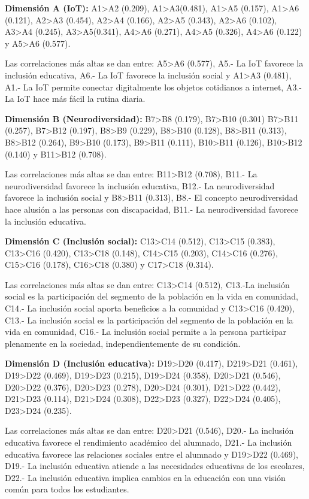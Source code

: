\documentclass[spanish]{textolivre}
\begin{document}
\textbf{Dimensión A (IoT):} A1>A2 (0.209), A1>A3(0.481), A1>A5 (0.157), A1>A6 (0.121), A2>A3 (0.454), A2>A4 (0.166), A2>A5 (0.343), A2>A6 (0.102), A3>A4 (0.245), A3>A5(0.341), A4>A6 (0.271), A4>A5 (0.326), A4>A6 (0.122) y A5>A6 (0.577).

Las correlaciones más altas se dan entre: A5>A6 (0.577), A5.- La IoT favorece la inclusión educativa, A6.- La IoT favorece la inclusión social y A1>A3 (0.481), A1.- La IoT permite conectar digitalmente los objetos cotidianos a internet, A3.- La IoT hace más fácil la rutina diaria.

\textbf{Dimensión B (Neurodiversidad):} B7>B8 (0.179), B7>B10 (0.301) B7>B11 (0.257), B7>B12 (0.197), B8>B9 (0.229), B8>B10 (0.128), B8>B11 (0.313), B8>B12 (0.264), B9>B10 (0.173), B9>B11 (0.111), B10>B11 (0.126), B10>B12 (0.140) y B11>B12 (0.708).

Las correlaciones más altas se dan entre: B11>B12 (0.708), B11.- La neurodiversidad favorece la inclusión educativa, B12.- La neurodiversidad favorece la inclusión social y B8>B11 (0.313), B8.- El concepto neurodiversidad hace alusión a las personas con discapacidad, B11.- La neurodiversidad favorece la inclusión educativa.

\textbf{Dimensión C (Inclusión social):} C13>C14 (0.512), C13>C15 (0.383), C13>C16 (0.420), C13>C18 (0.148), C14>C15 (0.203), C14>C16 (0.276), C15>C16 (0.178), C16>C18 (0.380) y C17>C18 (0.314).

Las correlaciones más altas se dan entre: C13>C14 (0.512), C13.-La inclusión social es la participación del segmento de la población en la vida en comunidad, C14.- La inclusión social aporta beneficios a la comunidad y C13>C16 (0.420), C13.- La inclusión social es la participación del segmento de la población en la vida en comunidad, C16.- La inclusión social permite a la persona participar plenamente en la sociedad, independientemente de su condición.

\textbf{Dimensión D (Inclusión educativa):} D19>D20 (0.417), D219>D21 (0.461), D19>D22 (0.469), D19>D23 (0.215), D19>D24 (0.358), D20>D21 (0.546), D20>D22 (0.376), D20>D23 (0.278), D20>D24 (0.301), D21>D22 (0.442), D21>D23 (0.114), D21>D24 (0.308), D22>D23 (0.327), D22>D24 (0.405), D23>D24 (0.235).

Las correlaciones más altas se dan entre: D20>D21 (0.546), D20.- La inclusión educativa favorece el rendimiento académico del alumnado, D21.- La inclusión educativa favorece las relaciones sociales entre el alumnado y D19>D22 (0.469), D19.- La inclusión educativa atiende a las necesidades educativas de los escolares, D22.- La inclusión educativa implica cambios en la educación con una visión común para todos los estudiantes.
\end{document}
